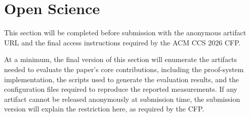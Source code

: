 \section{Open Science}\label{sec:open-science}

This section will be completed before submission with the anonymous artifact
URL and the final access instructions required by the ACM CCS 2026 CFP.

At a minimum, the final version of this section will enumerate the artifacts
needed to evaluate the paper's core contributions, including the proof-system
implementation, the scripts used to generate the evaluation results, and the
configuration files required to reproduce the reported measurements. If any
artifact cannot be released anonymously at submission time, the submission
version will explain the restriction here, as required by the CFP.
